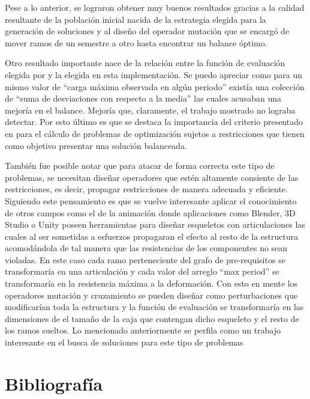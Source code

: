 \documentclass[letter, 10pt]{article}
\begin{document}
Pese a lo anterior, se lograron obtener muy buenos resultados gracias
a la calidad resultante de la población inicial nacida de la
estrategia elegida para la generación de soluciones y al diseño del
operador mutación que se encargó de mover ramos de un semestre a otro
hasta encontrar un balance óptimo.

Otro resultado importante nace de la relación entre la función de
evaluación elegida por \cite{castro2001variable} y la elegida en esta
implementación. Se puedo apreciar como para un mismo valor de ``carga
máxima observada en algún periodo'' existía una colección de ``suma de
desviaciones con respecto a la media'' las cuales acusaban una mejoría
en el balance. Mejoría que, claramente, el trabajo mostrado
\cite{castro2001variable} no lograba detectar. Por esto último es que
se destaca la importancia del criterio presentado en
\cite{schaus2007deviation} para el cálculo de problemas de
optimización sujetos a restricciones que tienen como objetivo
presentar una solución balanceada.


También fue posible notar que para atacar de forma correcta este tipo
de problemas, se necesitan diseñar operadores que estén altamente
consiente de las restricciones, es decir, propagar restricciones de
manera adecuada y eficiente. Siguiendo este pensamiento es que se
vuelve interesante aplicar el conocimiento de otros campos como el de
la animación donde aplicaciones como Blender, 3D Studio o Unity poseen
herramientas para diseñar esqueletos con articulaciones las cuales al
ser sometidas a esfuerzos propagaran el efecto al resto de la
estructura acomodándola de tal manera que las resistencias de los
componentes no sean violadas. En este caso cada ramo perteneciente del
grafo de pre-requisitos se transformaría en una articulación y cada
valor del arreglo ``max period'' se transformaría en la resistencia
máxima a la deformación. Con esto en mente los operadores mutación y
cruzamiento se pueden diseñar como perturbaciones que modificarían
toda la estructura y la función de evaluación se transformaría en las
dimensiones de el tamaño de la caja que contengan dicho esqueleto y el
resto de los ramos sueltos. Lo mencionado anteriormente se perfila
como un  trabajo interesante en el busca de soluciones para este
tipo de problemas

\section{Bibliografía}


\end{document}
